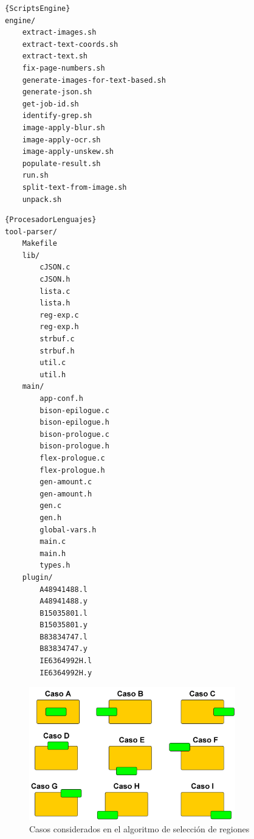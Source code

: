 \noindent\begin{minipage}{.45\textwidth}
\begin{lstlisting}[caption=Scripts del engine,frame=tlrb]{ScriptsEngine}
engine/
    extract-images.sh
    extract-text-coords.sh
    extract-text.sh
    fix-page-numbers.sh
    generate-images-for-text-based.sh
    generate-json.sh
    get-job-id.sh
    identify-grep.sh
    image-apply-blur.sh
    image-apply-ocr.sh
    image-apply-unskew.sh
    populate-result.sh
    run.sh
    split-text-from-image.sh
    unpack.sh
\end{lstlisting}
\end{minipage}\hfill
\begin{minipage}{.45\textwidth}
\begin{lstlisting}[caption=Fuentes del procesador de lenguaje intermedio,frame=tlrb,label=lst:fuentes-del-procesador-de-lenguajes]{ProcesadorLenguajes}
tool-parser/
    Makefile
    lib/
        cJSON.c
        cJSON.h
        lista.c
        lista.h
        reg-exp.c
        reg-exp.h
        strbuf.c
        strbuf.h
        util.c
        util.h
    main/
        app-conf.h
        bison-epilogue.c
        bison-epilogue.h
        bison-prologue.c
        bison-prologue.h
        flex-prologue.c
        flex-prologue.h
        gen-amount.c
        gen-amount.h
        gen.c
        gen.h
        global-vars.h
        main.c
        main.h
        types.h
    plugin/
        A48941488.l
        A48941488.y
        B15035801.l
        B15035801.y
        B83834747.l
        B83834747.y
        IE6364992H.l
        IE6364992H.y
\end{lstlisting}
\end{minipage}

\begin{figure}[hp!]
    \centering
    \includegraphics[width=0.8\textwidth]{imaxes/z-adicional/casos-algoritmo-seleccion-regiones.png}
    \caption{Casos considerados en el algoritmo de selección de regiones}
    \label{fig:casos-algoritmo-seleccion-regiones}
\end{figure}
